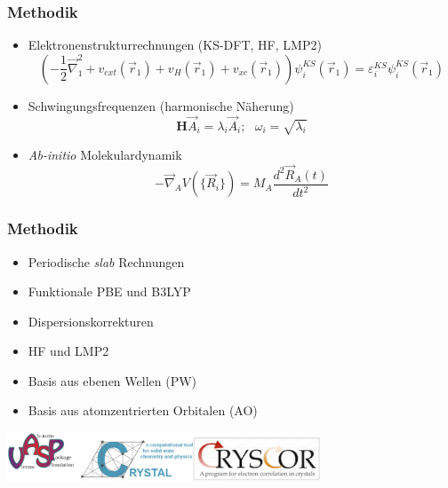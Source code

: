 \documentclass[hyperref={pdfpagelabels=false}]{beamer}
\begin{document}
\begin{frame}
 \frametitle{Methodik}
 \begin{itemize}
  \item Elektronenstrukturrechnungen (KS-DFT, HF, LMP2)
  \begin{equation*}
    \left(-\frac{1}{2}\vec{\nabla}^2_1 + v_{ext}(\vec{r}_1) + v_{H}(\vec{r}_1) + v_{xc}(\vec{r}_1) \right)\psi^{KS}_i(\vec{r}_1) = \varepsilon_i^{KS}\psi^{KS}_i(\vec{r}_1)
  \end{equation*}
  \pause
  \item Schwingungsfrequenzen (harmonische Näherung)
  \begin{equation*}
    \textbf{H} \vec{A}_i=\lambda_i\vec{A}_i; ~~~  \omega_i=\sqrt{\lambda_i}
  \end{equation*}
  \pause
  \item \textit{Ab-initio} Molekulardynamik
    \begin{equation*}
      -\vec{\nabla}_A V(\{\vec{R}_i\})=M_A\frac{d^2 \vec{R}_A(t)}{dt^2}
    \end{equation*}
 \end{itemize}
\end{frame}


\begin{frame}
 \frametitle{Methodik}
 \begin{itemize}
  \item Periodische \textit{slab} Rechnungen
  \item Funktionale PBE und B3LYP
  \item Dispersionskorrekturen
  \item HF und LMP2
  \item Basis aus ebenen Wellen (PW)
  \item Basis aus atomzentrierten Orbitalen (AO)
 \end{itemize}
 \centering
 \includegraphics[width=0.7\textwidth]{figures/programs-logos.eps}
\end{frame}
\end{document}

